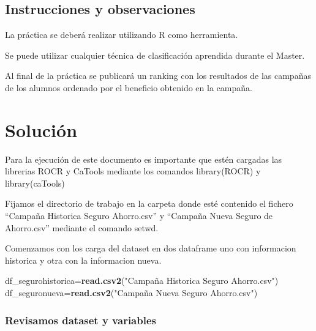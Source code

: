 \documentclass[]{article}
\newenvironment{Shaded}{\begin{snugshade}}{\end{snugshade}}
\newcommand{\KeywordTok}[1]{\textcolor[rgb]{0.13,0.29,0.53}{\textbf{#1}}}
\newcommand{\StringTok}[1]{\textcolor[rgb]{0.31,0.60,0.02}{#1}}
\newcommand{\OperatorTok}[1]{\textcolor[rgb]{0.81,0.36,0.00}{\textbf{#1}}}
\newcommand{\NormalTok}[1]{#1}
\begin{document}
\subsection{Instrucciones y
observaciones}\label{instrucciones-y-observaciones}

La práctica se deberá realizar utilizando R como herramienta.

Se puede utilizar cualquier técnica de clasificación aprendida durante
el Master.

Al final de la práctica se publicará un ranking con los resultados de
las campañas de los alumnos ordenado por el beneficio obtenido en la
campaña.

\section{Solución}\label{solucion}

Para la ejecución de este documento es importante que estén cargadas las
librerias ROCR y CaTools mediante los comandos library(ROCR) y
library(caTools)

Fijamos el directorio de trabajo en la carpeta donde esté contenido el
fichero ``Campaña Historica Seguro Ahorro.csv'' y ``Campaña Nueva Seguro
de Ahorro.csv'' mediante el comando setwd.

Comenzamos con los carga del dataset en dos dataframe uno con
informacion historica y otra con la informacion nueva.

\begin{Shaded}
\begin{Highlighting}[]
\NormalTok{df_segurohistorica=}\KeywordTok{read.csv2}\NormalTok{(}\StringTok{"Campaña Historica Seguro Ahorro.csv"}\NormalTok{)}
\NormalTok{df_seguronueva=}\KeywordTok{read.csv2}\NormalTok{(}\StringTok{"Campaña Nueva Seguro Ahorro.csv"}\NormalTok{)}
\end{Highlighting}
\end{Shaded}

\begin{Shaded}
\end{Shaded}

\subsubsection{Revisamos dataset y
variables}\label{revisamos-dataset-y-variables}
\end{document}

